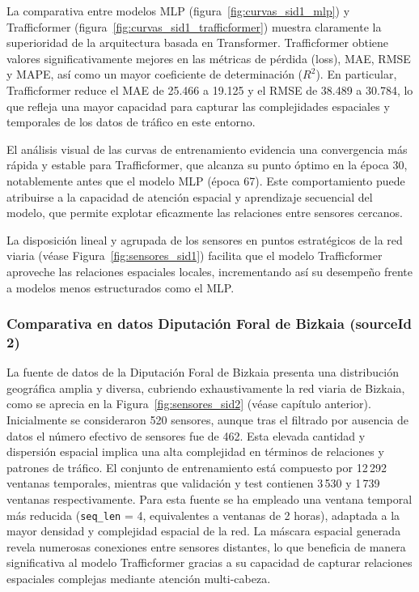 La comparativa entre modelos MLP (figura~\ref{fig:curvas_sid1_mlp}) y Trafficformer (figura~\ref{fig:curvas_sid1_trafficformer}) muestra claramente la superioridad de la arquitectura basada en Transformer. Trafficformer obtiene valores significativamente mejores en las métricas de pérdida (loss), MAE, RMSE y MAPE, así como un mayor coeficiente de determinación ($R^2$). En particular, Trafficformer reduce el MAE de 25.466 a 19.125 y el RMSE de 38.489 a 30.784, lo que refleja una mayor capacidad para capturar las complejidades espaciales y temporales de los datos de tráfico en este entorno.

El análisis visual de las curvas de entrenamiento evidencia una convergencia más rápida y estable para Trafficformer, que alcanza su punto óptimo en la época 30, notablemente antes que el modelo MLP (época 67). Este comportamiento puede atribuirse a la capacidad de atención espacial y aprendizaje secuencial del modelo, que permite explotar eficazmente las relaciones entre sensores cercanos.

La disposición lineal y agrupada de los sensores en puntos estratégicos de la red viaria (véase Figura~\ref{fig:sensores_sid1}) facilita que el modelo Trafficformer aproveche las relaciones espaciales locales, incrementando así su desempeño frente a modelos menos estructurados como el MLP.

\subsubsection*{Comparativa en datos Diputación Foral de Bizkaia (sourceId 2)}

La fuente de datos de la Diputación Foral de Bizkaia presenta una distribución geográfica amplia y diversa, cubriendo exhaustivamente la red viaria de Bizkaia, como se aprecia en la Figura~\ref{fig:sensores_sid2} (véase capítulo anterior). Inicialmente se consideraron 520 sensores, aunque tras el filtrado por ausencia de datos el número efectivo de sensores fue de 462. Esta elevada cantidad y dispersión espacial implica una alta complejidad en términos de relaciones y patrones de tráfico. El conjunto de entrenamiento está compuesto por 12\,292 ventanas temporales, mientras que validación y test contienen 3\,530 y 1\,739 ventanas respectivamente. Para esta fuente se ha empleado una ventana temporal más reducida (\texttt{seq\_len} = 4, equivalentes a ventanas de 2 horas), adaptada a la mayor densidad y complejidad espacial de la red. La máscara espacial generada revela numerosas conexiones entre sensores distantes, lo que beneficia de manera significativa al modelo Trafficformer gracias a su capacidad de capturar relaciones espaciales complejas mediante atención multi-cabeza.

